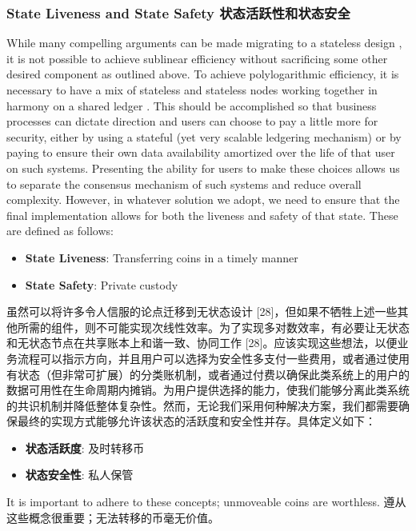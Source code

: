 \documentclass{ctexart}
\begin{document}
\subsubsection{State Liveness and State Safety 状态活跃性和状态安全}

While many compelling arguments can be made migrating to a stateless design \cite{Hot19}, it is not possible to achieve sublinear efficiency without sacrificing some other desired component as outlined above. To achieve polylogarithmic efficiency, it is necessary to have a mix of stateless and stateless nodes working together in harmony on a shared ledger \cite{Hot19}. This should be accomplished so that business processes can dictate direction and users can choose to pay a little more for security, either by using a stateful (yet very scalable ledgering mechanism) or by paying to ensure their own data availability amortized over the life of that user on such systems. Presenting the ability for users to make these choices allows us to separate the consensus mechanism of such systems and reduce overall complexity. However, in whatever solution we adopt, we need to ensure that the final implementation allows for both the liveness and safety of that state. These are defined as follows:

\begin{itemize}
\item \textbf{State Liveness}: Transferring coins in a timely manner
\item \textbf{State Safety}:  Private custody
\end{itemize}

虽然可以将许多令人信服的论点迁移到无状态设计 [28]，但如果不牺牲上述一些其他所需的组件，则不可能实现次线性效率。为了实现多对数效率，有必要让无状态和无状态节点在共享账本上和谐一致、协同工作 [28]。应该实现这些想法，以便业务流程可以指示方向，并且用户可以选择为安全性多支付一些费用，或者通过使用有状态（但非常可扩展）的分类账机制，或者通过付费以确保此类系统上的用户的数据可用性在生命周期内摊销。为用户提供选择的能力，使我们能够分离此类系统的共识机制并降低整体复杂性。然而，无论我们采用何种解决方案，我们都需要确保最终的实现方式能够允许该状态的活跃度和安全性并存。具体定义如下：

\begin{itemize}
\item \textbf{状态活跃度}: 及时转移币
\item \textbf{状态安全性}: 私人保管
\end{itemize}

It is important to adhere to these concepts; unmoveable coins are worthless. 遵从这些概念很重要；无法转移的币毫无价值。
\end{document}
